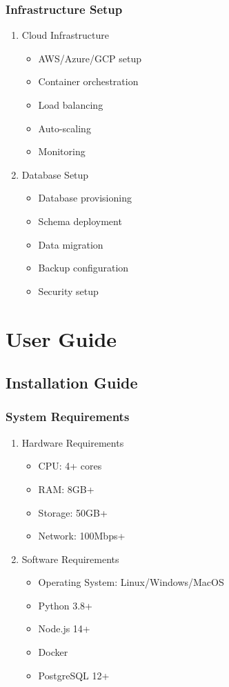 \documentclass[12pt,a4paper]{report}
\begin{document}
\subsection{Infrastructure Setup}
\begin{enumerate}
    \item Cloud Infrastructure
    \begin{itemize}
        \item AWS/Azure/GCP setup
        \item Container orchestration
        \item Load balancing
        \item Auto-scaling
        \item Monitoring
    \end{itemize}
    
    \item Database Setup
    \begin{itemize}
        \item Database provisioning
        \item Schema deployment
        \item Data migration
        \item Backup configuration
        \item Security setup
    \end{itemize}
\end{enumerate}

\chapter{User Guide}
\section{Installation Guide}
\subsection{System Requirements}
\begin{enumerate}
    \item Hardware Requirements
    \begin{itemize}
        \item CPU: 4+ cores
        \item RAM: 8GB+
        \item Storage: 50GB+
        \item Network: 100Mbps+
    \end{itemize}
    
    \item Software Requirements
    \begin{itemize}
        \item Operating System: Linux/Windows/MacOS
        \item Python 3.8+
        \item Node.js 14+
        \item Docker
        \item PostgreSQL 12+
    \end{itemize}
\end{enumerate}
\end{document}
